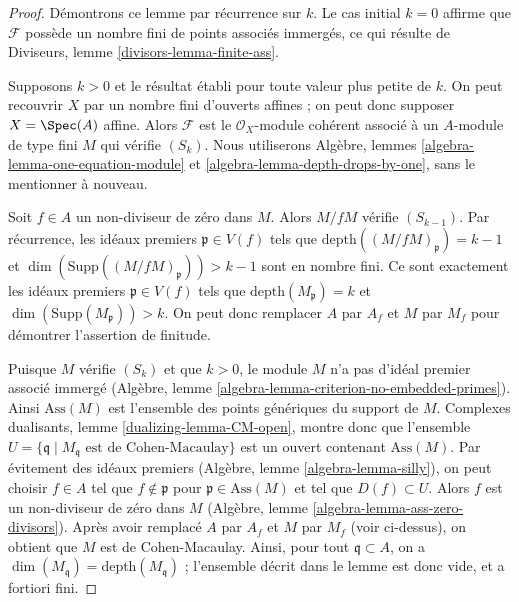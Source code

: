 \begin{proof}
Démontrons ce lemme par récurrence sur $k$. Le cas initial $k = 0$ affirme que $\mathcal{F}$ possède un nombre fini de points associés immergés, ce qui résulte de Diviseurs, lemme \ref{divisors-lemma-finite-ass}.

\medskip\noindent
Supposons $k > 0$ et le résultat établi pour toute valeur plus petite de $k$. On peut recouvrir $X$ par un nombre fini d'ouverts affines ; on peut donc supposer $X = \Spec(A)$ affine. Alors $\mathcal{F}$ est le $\mathcal{O}_X$-module cohérent associé à un $A$-module de type fini $M$ qui vérifie $(S_k)$. Nous utiliserons Algèbre, lemmes \ref{algebra-lemma-one-equation-module} et \ref{algebra-lemma-depth-drops-by-one}, sans le mentionner à nouveau.

\medskip\noindent
Soit $f \in A$ un non-diviseur de zéro dans $M$. Alors $M/fM$ vérifie $(S_{k - 1})$. Par récurrence, les idéaux premiers $\mathfrak p \in V(f)$ tels que $\text{depth}((M/fM)_\mathfrak p) = k - 1$ et $\dim(\text{Supp}((M/fM)_\mathfrak p)) > k - 1$ sont en nombre fini. Ce sont exactement les idéaux premiers $\mathfrak p \in V(f)$ tels que $\text{depth}(M_\mathfrak p) = k$ et $\dim(\text{Supp}(M_\mathfrak p)) > k$. On peut donc remplacer $A$ par $A_f$ et $M$ par $M_f$ pour démontrer l'assertion de finitude.

\medskip\noindent
Puisque $M$ vérifie $(S_k)$ et que $k > 0$, le module $M$ n'a pas d'idéal premier associé immergé (Algèbre, lemme \ref{algebra-lemma-criterion-no-embedded-primes}). Ainsi $\text{Ass}(M)$ est l'ensemble des points génériques du support de $M$. Complexes dualisants, lemme \ref{dualizing-lemma-CM-open}, montre donc que l'ensemble $U = \{\mathfrak q \mid M_\mathfrak q\text{ est de Cohen-Macaulay}\}$ est un ouvert contenant $\text{Ass}(M)$. Par évitement des idéaux premiers (Algèbre, lemme \ref{algebra-lemma-silly}), on peut choisir $f \in A$ tel que $f \not \in \mathfrak p$ pour $\mathfrak p \in \text{Ass}(M)$ et tel que $D(f) \subset U$. Alors $f$ est un non-diviseur de zéro dans $M$ (Algèbre, lemme \ref{algebra-lemma-ass-zero-divisors}). Après avoir remplacé $A$ par $A_f$ et $M$ par $M_f$ (voir ci-dessus), on obtient que $M$ est de Cohen-Macaulay. Ainsi, pour tout $\mathfrak q \subset A$, on a $\dim(M_\mathfrak q) = \text{depth}(M_\mathfrak q)$ ; l'ensemble décrit dans le lemme est donc vide, et a fortiori fini.
\end{proof}

